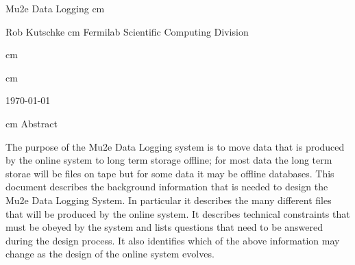\begin{center}
  {\Huge Mu2e Data Logging}
   cm

  Rob Kutschke
 cm
Fermilab Scientific Computing Division

 cm


%

%

 cm


\today

 cm
Abstract
\end{center}
\medskip

The purpose of the Mu2e Data Logging system is to move data
that is produced by the online system to long term storage offline;
for most data the long term storae will be files on tape
but for some data it may be offline databases.
This document describes the background information
that is needed to design the Mu2e Data Logging System.
In particular it describes
the many different files that will be produced by the online system.
It describes technical constraints that must be obeyed by the system
and lists questions that need to be answered during the design process.
It also identifies which of the above information may change as the
design of the online system evolves.
\cleardoublepage

\pagestyle{plain}

\setcounter{tocdepth}{4}
\setcounter{secnumdepth}{4}
%
\renewcommand*\contentsname{Detailed Table of Contents}
\textsf{\tableofcontents}
\cleardoublepage


